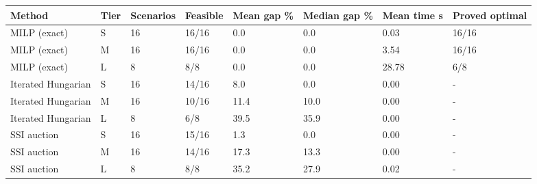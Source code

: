 \begin{tabular}{llllllll}
\toprule
Method & Tier & Scenarios & Feasible & Mean gap \% & Median gap \% & Mean time s & Proved optimal \\
\midrule
MILP (exact) & S & 16 & 16/16 & 0.0 & 0.0 & 0.03 & 16/16 \\
MILP (exact) & M & 16 & 16/16 & 0.0 & 0.0 & 3.54 & 16/16 \\
MILP (exact) & L & 8 & 8/8 & 0.0 & 0.0 & 28.78 & 6/8 \\
Iterated Hungarian & S & 16 & 14/16 & 8.0 & 0.0 & 0.00 & - \\
Iterated Hungarian & M & 16 & 10/16 & 11.4 & 10.0 & 0.00 & - \\
Iterated Hungarian & L & 8 & 6/8 & 39.5 & 35.9 & 0.00 & - \\
SSI auction & S & 16 & 15/16 & 1.3 & 0.0 & 0.00 & - \\
SSI auction & M & 16 & 14/16 & 17.3 & 13.3 & 0.00 & - \\
SSI auction & L & 8 & 8/8 & 35.2 & 27.9 & 0.02 & - \\
\bottomrule
\end{tabular}
